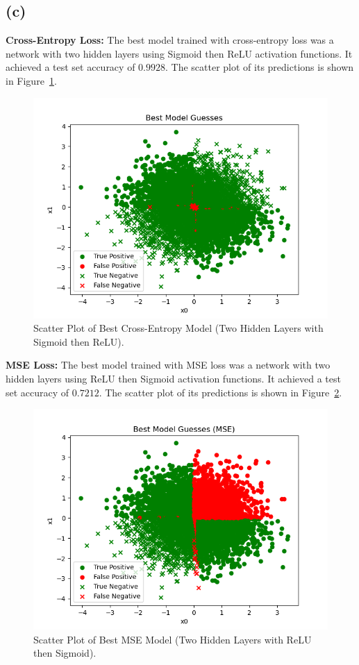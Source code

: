 \documentclass{article}
\begin{document}
\subsection*{(c)}

\textbf{Cross-Entropy Loss:}  
The best model trained with cross-entropy loss was a network with two hidden layers using Sigmoid then ReLU activation functions. It achieved a test set accuracy of \(0.9928\). The scatter plot of its predictions is shown in Figure~\ref{fig:ce_scatter}.

\begin{figure}[ht]
    \centering
    \includegraphics[width=0.7\linewidth]{cross_entropy_scatter.png}
    \caption{Scatter Plot of Best Cross-Entropy Model (Two Hidden Layers with Sigmoid then ReLU).}
    \label{fig:ce_scatter}
\end{figure}

\textbf{MSE Loss:}  
The best model trained with MSE loss was a network with two hidden layers using ReLU then Sigmoid activation functions. It achieved a test set accuracy of \(0.7212\). The scatter plot of its predictions is shown in Figure~\ref{fig:mse_scatter}.

\begin{figure}[ht]
    \centering
    \includegraphics[width=0.7\linewidth]{mse_scatter.png}
    \caption{Scatter Plot of Best MSE Model (Two Hidden Layers with ReLU then Sigmoid).}
    \label{fig:mse_scatter}
\end{figure}
\end{document}
